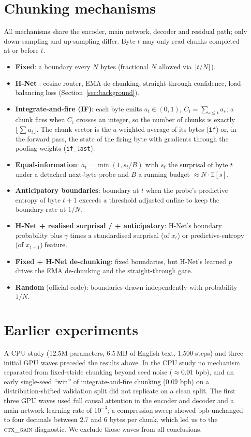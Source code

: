 \documentclass[10pt]{article}
\newcommand{\ctx}{\textsc{ctx\_gain}}
\newcommand{\bpb}{bpb}
\begin{document}
\section{Chunking mechanisms}
\label{app:chunkers}
All mechanisms share the encoder, main network, decoder and residual path; only down-sampling
and up-sampling differ. Byte $t$ may only read chunks completed at or before $t$.
\begin{itemize}
\item \textbf{Fixed}: a boundary every $N$ bytes (fractional $N$ allowed via $\lfloor t/N\rfloor$).
\item \textbf{H-Net} \citep{hwang2025hnet}: cosine router, EMA de-chunking, straight-through
  confidence, load-balancing loss (Section~\ref{sec:background}).
\item \textbf{Integrate-and-fire (IF)}: each byte emits $a_t\in(0,1)$, $C_t=\sum_{s\le t}a_s$; a chunk
  fires when $C_t$ crosses an integer, so the number of chunks is exactly $\lfloor\sum a_t\rfloor$.
  The chunk vector is the $a$-weighted average of its bytes (\texttt{if}) or, in the forward pass,
  the state of the firing byte with gradients through the pooling weights (\texttt{if\_last}).
\item \textbf{Equal-information}: $a_t=\min(1,s_t/B)$ with $s_t$ the surprisal of byte $t$ under a
  detached next-byte probe and $B$ a running budget $\approx N\cdot\mathbb{E}[s]$.
\item \textbf{Anticipatory boundaries}: boundary at $t$ when the probe's predictive entropy of byte
  $t{+}1$ exceeds a threshold adjusted online to keep the boundary rate at $1/N$.
\item \textbf{H-Net + realised surprisal / + anticipatory}: H-Net's boundary probability plus $\gamma$ times
  a standardised surprisal (of $x_t$) or predictive-entropy (of $x_{t+1}$) feature.
\item \textbf{Fixed + H-Net de-chunking}: fixed boundaries, but H-Net's learned $p$ drives the EMA
  de-chunking and the straight-through gate.
\item \textbf{Random} (official code): boundaries drawn independently with probability $1/N$.
\end{itemize}

\section{Earlier experiments}
\label{app:earlier}
A CPU study (12.5M parameters, 6.5\,MB of English text, 1{,}500 steps) and three initial GPU
waves preceded the results above. In the CPU study no mechanism separated from fixed-stride
chunking beyond seed noise ($\approx$0.01 \bpb), and an early single-seed ``win'' of
integrate-and-fire chunking (0.09 \bpb) on a distribution-shifted validation split did not
replicate on a clean split. The first three GPU waves used full causal attention in the
encoder and decoder and a main-network learning rate of $10^{-3}$; a compression sweep showed
\bpb{} unchanged to four decimals between 2.7 and 6 bytes per chunk, which led us to the
\ctx{} diagnostic. We exclude those waves from all conclusions.
\end{document}
